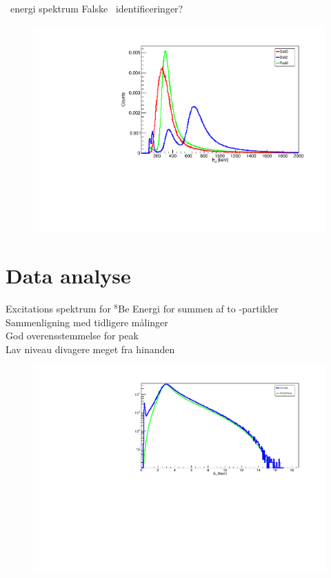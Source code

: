 \begin{frame}{\be\ energi spektrum}
	Falske \be\ identificeringer?
	\begin{figure}
		\includegraphics[width=.7\columnwidth]{../figures/betaSpec.pdf}
	\end{figure}
\end{frame}

\section{Data analyse}

\begin{frame}{Excitations spektrum for $^8$Be}
	Energi for summen af to \al-partikler\\
	Sammenligning med tidligere målinger \\
	God overensstemmelse for peak \\
	Lav niveau divagere meget fra hinanden
	\begin{figure}
		\includegraphics[width=.8\columnwidth]{../figures/bataraCompare.pdf}
	\end{figure}	
\end{frame}

